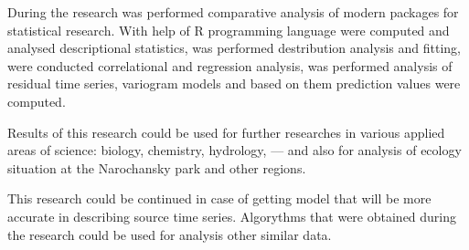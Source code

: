 During the research was performed comparative analysis of modern packages for statistical research. With help of R programming language were computed and analysed descriptional statistics, was performed destribution analysis and fitting, were conducted correlational and regression analysis, was performed analysis of residual time series, variogram models and based on them prediction values were computed.

Results of this research could be used for further researches in various applied areas of science: biology, chemistry, hydrology, --- and also for analysis of ecology situation at the Narochansky park and other regions.

This research could be continued in case of getting model that will be more accurate in describing source time series. Algorythms that were obtained during the research could be used for analysis other similar data.
